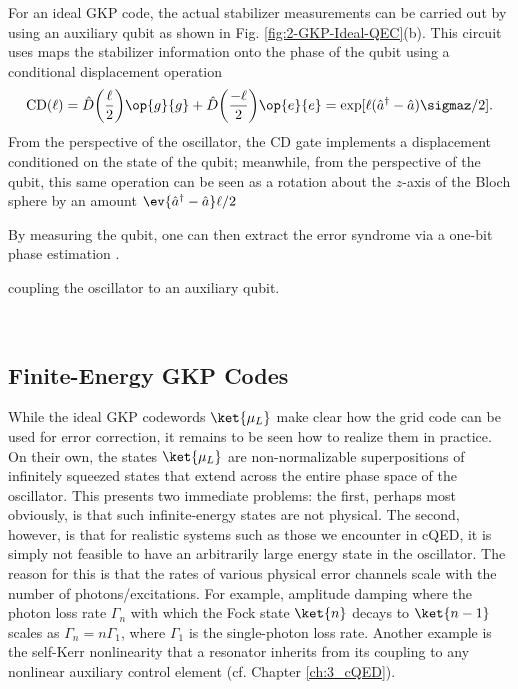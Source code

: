 For an ideal GKP code, the actual stabilizer measurements can be carried out by using an auxiliary qubit as shown in Fig. \ref{fig:2-GKP-Ideal-QEC}(b). This circuit uses maps the stabilizer information onto the phase of the qubit using a conditional displacement operation
\begin{equation}
    {\rm CD}(\ell) = \hat{D}\bigg(\frac{\ell}{2}\bigg)\op{g}{g} + \hat{D}\bigg(\frac{-\ell}{2}\bigg)\op{e}{e} = \exp[\ell(\hat{a}^\dagger - \hat{a}) \sigmaz / 2].
\end{equation}
From the perspective of the oscillator, the CD gate implements a displacement conditioned on the state of the qubit; meanwhile, from the perspective of the qubit, this same operation can be seen as a rotation about the $z$-axis of the Bloch sphere by an amount $\ev{\hat{a}^\dagger - \hat{a}}\ell/2$



By measuring the qubit, one can then extract the error syndrome via a one-bit phase estimation \cite{terhal2016phase-estimation}. 


coupling the oscillator to an auxiliary qubit. 





$ $





\subsection{Finite-Energy GKP Codes}

While the ideal GKP codewords $\ket{\mu_L}$ make clear how the grid code can be used for error correction, it remains to be seen how to realize them in practice. On their own, the states $\ket{\mu_L}$ are non-normalizable superpositions of infinitely squeezed states that extend across the entire phase space of the oscillator. This presents two immediate problems: the first, perhaps most obviously, is that such infinite-energy states are not physical. The second, however, is that for realistic systems such as those we encounter in cQED, it is simply not feasible to have an arbitrarily large energy state in the oscillator. The reason for this is that the rates of various physical error channels scale with the number of photons/excitations. For example, amplitude damping where the photon loss rate $\Gamma_n$ with which the Fock state $\ket{n}$ decays to $\ket{n-1}$ scales as $\Gamma_n = n\Gamma_1$, where $\Gamma_1$ is the single-photon loss rate. Another example is the self-Kerr nonlinearity that a resonator inherits from its coupling to any nonlinear auxiliary control element (cf. Chapter \ref{ch:3_cQED}). 

